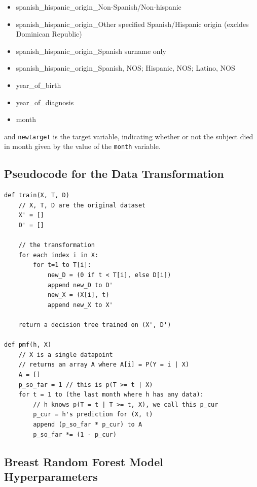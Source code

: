 \documentclass[10pt,letterpaper]{article}
\newcommand{\codewhite}[1]{\colorbox{white}{\texttt{#1}}}
\begin{document}
\begin{itemize}[noitemsep]
\item spanish\_hispanic\_origin\_Non-Spanish/Non-hispanic
\item spanish\_hispanic\_origin\_Other specified Spanish/Hispanic origin (excldes Dominican Republic)
\item spanish\_hispanic\_origin\_Spanish surname only
\item spanish\_hispanic\_origin\_Spanish, NOS; Hispanic, NOS; Latino, NOS
\item year\_of\_birth
\item year\_of\_diagnosis
\item month
\end{itemize}

and 
\codewhite{newtarget} is the target variable, indicating whether or not the subject died in month given by the value of the \codewhite{month} variable.






\subsection*{Pseudocode for the Data Transformation}
\label{subsec:pseudocode}

\begin{verbatim}
def train(X, T, D)
    // X, T, D are the original dataset
    X' = []
    D' = []

    // the transformation
    for each index i in X:
        for t=1 to T[i]:
            new_D = (0 if t < T[i], else D[i])
            append new_D to D'
            new_X = (X[i], t)
            append new_X to X'

    return a decision tree trained on (X', D')

def pmf(h, X)
    // X is a single datapoint
    // returns an array A where A[i] = P(Y = i | X)
    A = []
    p_so_far = 1 // this is p(T >= t | X)
    for t = 1 to (the last month where h has any data):
        // h knows p(T = t | T >= t, X), we call this p_cur
        p_cur = h's prediction for (X, t)
        append (p_so_far * p_cur) to A
        p_so_far *= (1 - p_cur)

\end{verbatim}

\subsection*{Breast Random Forest Model Hyperparameters}
\label{subsec:breastrf}
\end{document}
